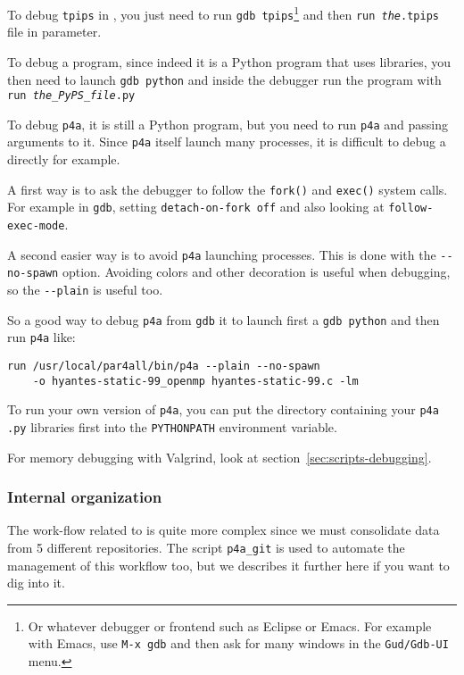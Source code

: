 \documentclass[a4paper]{article}
\begin{document}
To debug \texttt{tpips} in \Apfa, you just need to run \texttt{gdb
  tpips}\footnote{Or whatever debugger or frontend such as Eclipse or
  Emacs. For example with Emacs, use \texttt{M-x gdb} and then ask for
  many windows in the \texttt{Gud/Gdb-UI} menu.} and then \texttt{run
  \emph{the}.tpips} file in parameter.

To debug a \Apyps program, since indeed it is a Python program that uses
\Apips libraries, you then need to launch \texttt{gdb python} and inside
the debugger run the program with \texttt{run \emph{the\_PyPS\_file}.py}

To debug \texttt{p4a}, it is still a Python program, but you need to run
\texttt{p4a} and passing arguments to it. Since \texttt{p4a} itself
launch many processes, it is difficult to debug a \Apips directly for
example.

A first way is to ask the debugger to follow the
\texttt{fork()} and \texttt{exec()} system calls. For example in
\texttt{gdb}, setting \texttt{detach-on-fork off} and also looking at
\texttt{follow-exec-mode}.

A second easier way is to avoid \texttt{p4a} launching processes. This is
done with the \verb/--no-spawn/ option. Avoiding colors and other
decoration is useful when debugging, so the \verb/--plain/ is useful too.

So a good way to debug \texttt{p4a} from \texttt{gdb} it to launch first a
\texttt{gdb python} and then run \texttt{p4a} like:
\begin{verbatim}
run /usr/local/par4all/bin/p4a --plain --no-spawn
    -o hyantes-static-99_openmp hyantes-static-99.c -lm
\end{verbatim}

To run your own version of \texttt{p4a}, you can put the directory
containing your \texttt{p4a} \texttt{.py} libraries first into the
\texttt{PYTHONPATH} environment variable.

For memory debugging with Valgrind, look at
section~\ref{sec:scripts-debugging}.


\subsubsection{Internal organization}
\label{sec:intern-organ}

The work-flow related to \Apips is quite more complex since we must
consolidate data from 5 different \Asvn repositories. The script
\verb|p4a_git| is used to automate the management of this workflow too,
but we describes it further here if you want to dig into it.
\end{document}
